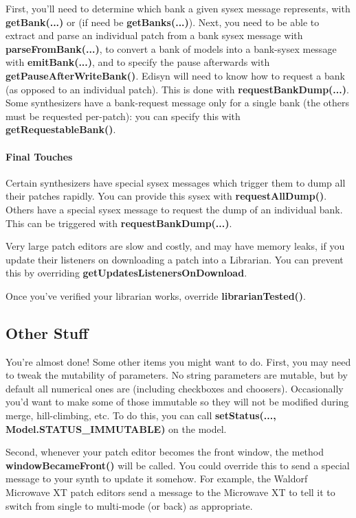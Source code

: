 \documentclass{article}
\begin{document}
First, you'll need to determine which bank a given sysex message represents, with {\bf getBank(...)} or (if need be {\bf getBanks(...)}).  Next, you need to be able to extract and parse an individual patch from a bank sysex message with {\bf parseFromBank(...)}, to convert a bank of models into a bank-sysex message with {\bf emitBank(...)}, and to specify the pause afterwards with {\bf getPauseAfterWriteBank()}.  Edisyn will need to know how to request a bank (as opposed to an individual patch).  This is done with {\bf requestBankDump(...)}.  Some synthesizers have a bank-request message only for a single bank (the others must be requested per-patch): you can specify this with {\bf getRequestableBank()}. 

\paragraph{Final Touches}

Certain synthesizers have special sysex messages which trigger them to dump all their patches rapidly. You can provide this sysex with {\bf requestAllDump()}.  Others have a special sysex message to request the dump of an individual bank.  This can be triggered with {\bf requestBankDump(...)}.

Very large patch editors are slow and costly, and may have memory leaks, if you update their listeners on downloading a patch into a Librarian.  You can prevent this by overriding {\bf getUpdatesListenersOnDownload}.

Once you've verified your librarian works, override {\bf librarianTested()}.

\subsection{Other Stuff}
You're almost done!  Some other items you might want to do.  First, you may need to tweak the mutability of parameters.  No string parameters are mutable, but by default all numerical ones are (including checkboxes and choosers).  Occasionally you'd want to make some of those immutable so they will not be modified during merge, hill-climbing, etc.  To do this, you can call {\bf setStatus(..., Model.STATUS\_IMMUTABLE)} on the model.

Second, whenever your patch editor becomes the front window, the method {\bf windowBecameFront()} will be called.  You could override this to send a special message to your synth to update it somehow.  For example, the Waldorf Microwave XT patch editors send a message to the Microwave XT to tell it to switch from single to multi-mode (or back) as appropriate.
\end{document}
